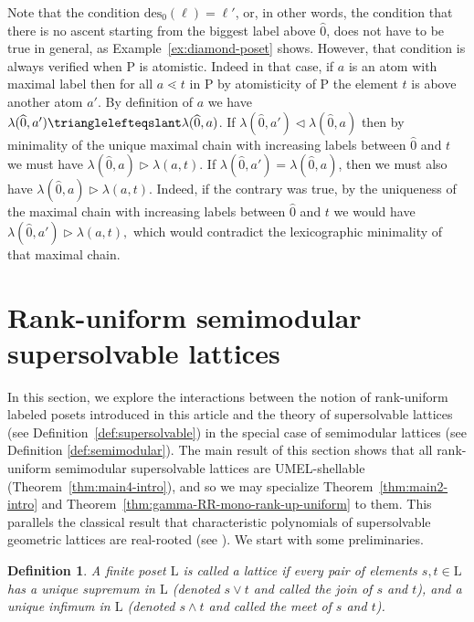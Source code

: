 \documentclass[11pt,a4paper]{amsart}
\theoremstyle{results}
\theoremstyle{definitions}
\newtheorem{definition}[thm]{Definition}
\def\P{\mathbb{P}}
\newcommand{\zero}{\hat{0}}
\newcommand{\des}{\mathrm{des}}
\newcommand{\Latt}{\mathrm{L}}
\renewcommand{\P}{\mathrm{P}}
\renewcommand{\hat}{\widehat}
\begin{document}
Note that the condition $\des_0(\ell) = \ell'$, or, in other words, the condition that there is no ascent starting from the biggest label above $\zero$, does not have to be true in general, as Example~\ref{ex:diamond-poset} shows. However, that condition is always verified when $\P$ is atomistic. Indeed in that case, if $a$ is an atom with maximal label then for all $a \lessdot t$ in $\P$ by atomisticity of $\P$ the element $t$ is above another atom $a'.$ By definition of $a$ we have $\lambda(\zero, a') \trianglelefteqslant \lambda(\zero, a)$. If $\lambda(\zero, a') \vartriangleleft \lambda(\zero, a)$ then by minimality of the unique maximal chain with increasing labels between $\zero$ and $t$ we must have $\lambda(\zero, a) \vartriangleright \lambda(a, t).$ If $\lambda(\zero, a') = \lambda(\zero, a)$, then we must also have $\lambda(\zero, a) \vartriangleright \lambda(a, t).$ Indeed, if the contrary was true, by the uniqueness of the maximal chain with increasing labels between $\zero$ and $t$ we would have $\lambda(\zero, a') \vartriangleright \lambda(a, t),$ which would contradict the lexicographic minimality of that maximal chain. 

\section{Rank-uniform semimodular supersolvable lattices}
\label{sec:supersolvable}
In this section, we explore the interactions between the notion of rank-uniform labeled posets introduced in this article and the theory of supersolvable lattices (see Definition~\ref{def:supersolvable}) in the special case of semimodular lattices (see Definition \ref{def:semimodular}). The main result of this section shows that all rank-uniform semimodular supersolvable lattices are UMEL-shellable (Theorem~\ref{thm:main4-intro}), and so we may specialize Theorem~\ref{thm:main2-intro} and Theorem~\ref{thm:gamma-RR-mono-rank-up-uniform} to them. This parallels the classical result that characteristic polynomials of supersolvable geometric lattices are real-rooted (see \cite{Stanley1971ModularElements}). We start with some preliminaries.  
\begin{definition}
A finite poset $\Latt$ is called a \emph{lattice} if every pair of elements $s, t \in \Latt$ has a unique supremum in $\Latt$ (denoted $s \vee t$ and called the \emph{join} of $s$ and $t$), and a unique infimum in $\Latt$ (denoted $s \wedge t$ and called the \emph{meet} of $s$ and $t$).
\end{definition} 
\end{document}
